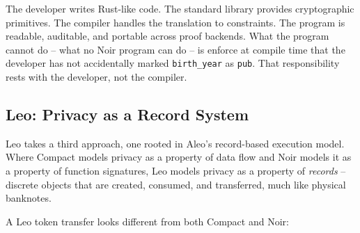 \documentclass[
  11pt,
  openany]{report}
\begin{document}
The developer writes Rust-like code. The standard library provides cryptographic
primitives. The compiler handles the translation to constraints. The program is
readable, auditable, and portable across proof backends. What the program cannot
do -- what no Noir program can do -- is enforce at compile time that the
developer has not accidentally marked \texttt{birth\_year} as \texttt{pub}. That
responsibility rests with the developer, not the compiler.

\subsection{Leo: Privacy as a Record
System}\label{leo-privacy-as-a-record-system}

Leo takes a third approach, one rooted in Aleo's record-based execution model.
Where Compact models privacy as a property of data flow and Noir models it as a
property of function signatures, Leo models privacy as a property of
\emph{records} -- discrete objects that are created, consumed, and transferred,
much like physical banknotes.

A Leo token transfer looks different from both Compact and Noir:
\end{document}
